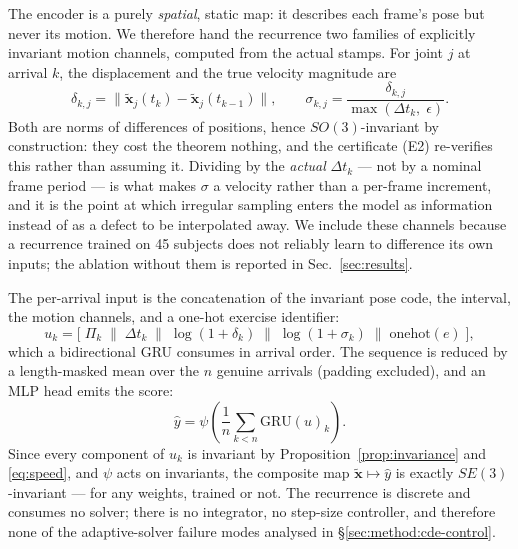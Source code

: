 The encoder is a purely \emph{spatial}, static map: it describes each frame's pose but never its
motion. We therefore hand the recurrence two families of explicitly invariant motion channels,
computed from the actual stamps. For joint $j$ at arrival $k$, the displacement and the true velocity
magnitude are
%
\begin{equation}
\label{eq:speed}
\delta_{k,j}=\big\|\tilde{\bm{x}}_j(t_k)-\tilde{\bm{x}}_j(t_{k-1})\big\|,
\qquad
\sigma_{k,j}=\frac{\delta_{k,j}}{\max(\Delta t_k,\;\epsilon)} .
\end{equation}
%
Both are norms of differences of positions, hence $SO(3)$-invariant by construction: they cost the
theorem nothing, and the certificate (E2) re-verifies this rather than assuming it. Dividing by the
\emph{actual} $\Delta t_k$ --- not by a nominal frame period --- is what makes $\sigma$ a
velocity rather than a per-frame increment, and it is the point at which irregular sampling enters
the model as information instead of as a defect to be interpolated away. We include these channels
because a recurrence trained on 45 subjects does not reliably learn to difference its own inputs; the
ablation without them is reported in Sec.~\ref{sec:results}.

The per-arrival input is the concatenation of the invariant pose code, the interval, the motion
channels, and a one-hot exercise identifier:
%
\begin{equation}
\label{eq:input}
u_k=\Big[\;\Pi_k \;\big\|\; \Delta t_k \;\big\|\; \log(1+\delta_k) \;\big\|\; \log(1+\sigma_k)
\;\big\|\; \mathrm{onehot}(e)\;\Big],
\end{equation}
%
which a bidirectional GRU consumes in arrival order. The sequence is reduced by a length-masked mean
over the $n$ genuine arrivals (padding excluded), and an MLP head emits the score:
%
\begin{equation}
\label{eq:head}
\hat y=\psi\!\left(\frac{1}{n}\sum_{k<n}\mathrm{GRU}(u)_k\right).
\end{equation}
%
Since every component of $u_k$ is invariant by Proposition~\ref{prop:invariance} and
\eqref{eq:speed}, and $\psi$ acts on invariants, the composite map
$\tilde{\bm{x}}\mapsto\hat y$ is exactly $SE(3)$-invariant --- for any weights, trained or not. The
recurrence is discrete and consumes no solver; there is no integrator, no step-size controller, and
therefore none of the adaptive-solver failure modes analysed in \S\ref{sec:method:cde-control}.

